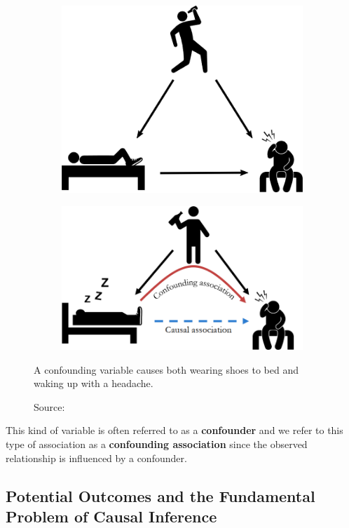 \begin{figure}[h]
    \centering
    \begin{subfigure}{.5\textwidth}
      \centering
      \includegraphics[width=.8\linewidth]{figures/ch3/9.conf.png}
    \end{subfigure}%
    \begin{subfigure}{.5\textwidth}
      \centering
      \includegraphics[width=.9\linewidth]{figures/ch3/10.confcol.png}
    \end{subfigure}
    \caption{A confounding variable causes both wearing shoes to bed and waking up with a headache.}
    \vspace{-10px}
    \caption*{\scriptsize{Source: \cite{Neal_2020a}}}
    \label{fig:confounding}
\end{figure}

This kind of variable is often referred to as a \textbf{confounder} and
we refer to this type of association as a \textbf{confounding association}
since the observed relationship is influenced by a confounder.

\subsection{Potential Outcomes and the Fundamental Problem of Causal Inference}


